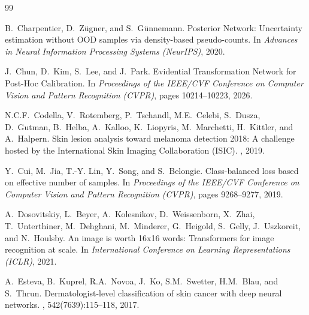 \documentclass[letterpaper]{article} %
\begin{document}
\begin{thebibliography}{99}

B.~Charpentier, D.~Z{\"u}gner, and S.~G{\"u}nnemann.
\newblock Posterior Network: Uncertainty estimation without OOD samples via density-based pseudo-counts.
\newblock In {\em Advances in Neural Information Processing Systems (NeurIPS)}, 2020.

J.~Chun, D.~Kim, S.~Lee, and J.~Park.
\newblock Evidential Transformation Network for Post-Hoc Calibration.
\newblock In {\em Proceedings of the IEEE/CVF Conference on Computer Vision and Pattern Recognition (CVPR)}, pages 10214--10223, 2026.

N.C.F.~Codella, V.~Rotemberg, P.~Tschandl, M.E.~Celebi, S.~Dusza, D.~Gutman, B.~Helba, A.~Kalloo, K.~Liopyris, M.~Marchetti, H.~Kittler, and A.~Halpern.
\newblock Skin lesion analysis toward melanoma detection 2018: A challenge hosted by the International Skin Imaging Collaboration (ISIC).
, 2019.

Y.~Cui, M.~Jia, T.-Y. Lin, Y.~Song, and S.~Belongie.
\newblock Class-balanced loss based on effective number of samples.
\newblock In {\em Proceedings of the IEEE/CVF Conference on Computer Vision and Pattern Recognition (CVPR)}, pages 9268--9277, 2019.

A.~Dosovitskiy, L.~Beyer, A.~Kolesnikov, D.~Weissenborn, X.~Zhai, T.~Unterthiner, M.~Dehghani, M.~Minderer, G.~Heigold, S.~Gelly, J.~Uszkoreit, and N.~Houlsby.
\newblock An image is worth 16x16 words: Transformers for image recognition at scale.
\newblock In {\em International Conference on Learning Representations (ICLR)}, 2021.

A.~Esteva, B.~Kuprel, R.A.~Novoa, J.~Ko, S.M.~Swetter, H.M.~Blau, and S.~Thrun.
\newblock Dermatologist-level classification of skin cancer with deep neural networks.
, 542(7639):115--118, 2017.


\end{thebibliography}
\end{document}

